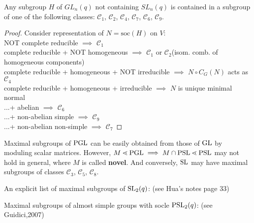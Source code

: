 \documentclass[a4paper,11pt]{article}
\def\subtitle#1{\section{#1}}
\begin{document}
\begin{theorem}
    Any subgroup $H$ of $GL_n(q)$ not containing $SL_n(q)$ is contained in a subgroup of one of the following classes: $\mathscr{C}_1$, $\mathscr{C}_2$,  $\mathscr{C}_4$,   $\mathscr{C}_7$, $\mathscr{C}_6$, $\mathscr{C}_9$.
\end{theorem}
\begin{proof} Consider representation of $N=\mathrm{soc}(H)$ on $V$:\\
    NOT complete reducible $\implies$ $\mathscr{C}_1$\\
    complete reducible + NOT homogeneous $\implies$ $\mathscr{C}_1$ or $\mathscr{C}_2$(isom. comb. of homogeneous components)\\
    complete reducible + homogeneous + NOT irreducible $\implies$ $N\circ C_G(N)$ acts as  $\mathscr{C}_4$\\
    complete reducible + homogeneous + irreducible $\implies$ $N$ is unique minimal normal\\
    ...+ abelian $\implies$ $\mathscr{C}_6$\\
    ...+ non-abelian simple $\implies$ $\mathscr{C}_9$\\
    ...+ non-abelian non-simple $\implies$ $\mathscr{C}_7$
\end{proof}


Maximal subgroups of $\mathrm{PGL}$ can be easily obtained from those of $\mathrm{GL}$ by moduling scalar matrices. However, $M\lessdot \mathrm{PGL}\implies M\cap \mathrm{PSL}\lessdot \mathrm{PSL}$ may not hold in general, where $M$ is called \textbf{novel}. And conversely, $\mathrm{SL}$ may have maximal subgroups of classes $\mathscr{C}_3$, $\mathscr{C}_5$, $\mathscr{C}_8$.

An explicit list of maximal subgroups of $\mathrm{SL}_2(q)$: (see Hua's notes page 33)

Maximal subgroups of almost simple groups with socle $\mathrm{PSL}_2(q)$: (see Guidici,2007)



\begin{comment}
\subtitle{Applications}

role of AS in classification of 2-arc-trans graph: see [8,lemma 5.2-5.3] and [9]

classifying AS 2-arc transitive graphs (for certain infinite families of AS groups)

linear[Hassani], Suzuki or Ree [3,4], An/Sn (V-primitive) [10], 

\begin{example}
    Finite $G$ corefree $H<G$ and 2-element $g$ give a coset graph $\Gamma(G,H,HgH)$. It is $(G,2)$-arc-transitive iff cond1
\end{example}


If $\Gamma$ is $(G,2)$-arc-transitive where $G$ is 2-dim linear, then $\Gamma$ is a coset graph $\Gamma(G,H,HgH)$ above, i.e. no more. And a local discription.

\end{comment}




\ifx\ChapThreeSecThree\undefined %
     
\end{document}
